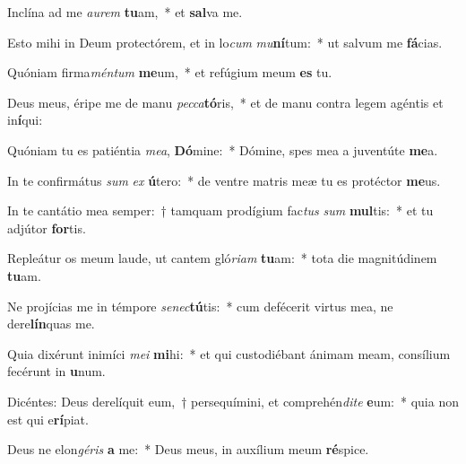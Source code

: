 \item Inclína ad me \textit{au}\textit{rem} \textbf{tu}am,~* et \textbf{sal}va me.
\item Esto mihi in Deum protectórem, et in lo\textit{cum} \textit{mu}\textbf{ní}tum:~* ut salvum me \textbf{fá}cias.
\item Quóniam firma\textit{mén}\textit{tum} \textbf{me}um,~* et refúgium meum \textbf{es} tu.
\item Deus meus, éripe me de manu \textit{pec}\textit{ca}\textbf{tó}ris,~* et de manu contra legem agéntis et in\textbf{í}qui:
\item Quóniam tu es patiéntia \textit{me}\textit{a}, \textbf{Dó}mine:~* Dómine, spes mea a juventúte \textbf{me}a.
\item In te confirmátus \textit{sum} \textit{ex} \textbf{ú}tero:~* de ventre matris meæ tu es protéctor \textbf{me}us.
\item In te cantátio mea semper:~† tamquam prodígium fac\textit{tus} \textit{sum} \textbf{mul}tis:~* et tu adjútor \textbf{for}tis.
\item Repleátur os meum laude, ut cantem gló\textit{ri}\textit{am} \textbf{tu}am:~* tota die magnitúdinem \textbf{tu}am.
\item Ne projícias me in témpore \textit{se}\textit{nec}\textbf{tú}tis:~* cum defécerit virtus mea, ne dere\textbf{lín}quas me.
\item Quia dixérunt inimíci \textit{me}\textit{i} \textbf{mi}hi:~* et qui custodiébant ánimam meam, consílium fecérunt in \textbf{u}num.
\item Dicéntes: Deus derelíquit eum,~† persequímini, et comprehén\textit{di}\textit{te} \textbf{e}um:~* quia non est qui e\textbf{rí}piat.
\item Deus ne elon\textit{gé}\textit{ris} \textbf{a} me:~* Deus meus, in auxílium meum \textbf{ré}spice.
